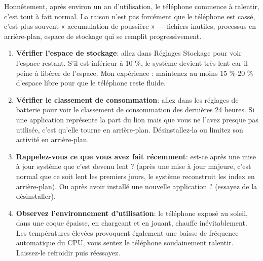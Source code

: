 


Honnêtement, après environ un an d'utilisation, le téléphone commence à ralentir, c'est tout à fait normal. La raison n'est pas forcément que le téléphone est cassé, c'est plus souvent « accumulation de poussière » — fichiers inutiles, processus en arrière-plan, espace de stockage qui se remplit progressivement.


\begin{enumerate}
  \item \textbf{Vérifier l'espace de stockage}: allez dans Réglages Stockage pour voir l'espace restant. S'il est inférieur à 10 \%, le système devient très lent car il peine à libérer de l'espace. Mon expérience : maintenez au moins 15 \%-20 \% d'espace libre pour que le téléphone reste fluide.
  \item \textbf{Vérifier le classement de consommation}: allez dans les réglages de batterie pour voir le classement de consommation des dernières 24 heures. Si une application représente la part du lion mais que vous ne l'avez presque pas utilisée, c'est qu'elle tourne en arrière-plan. Désinstallez-la ou limitez son activité en arrière-plan.
  \item \textbf{Rappelez-vous ce que vous avez fait récemment}: est-ce après une mise à jour système que c'est devenu lent ? (après une mise à jour majeure, c'est normal que ce soit lent les premiers jours, le système reconstruit les index en arrière-plan). Ou après avoir installé une nouvelle application ? (essayez de la désinstaller).
  \item \textbf{Observez l'environnement d'utilisation}: le téléphone exposé au soleil, dans une coque épaisse, en chargeant et en jouant, chauffe inévitablement. Les températures élevées provoquent également une baisse de fréquence automatique du CPU, vous sentez le téléphone soudainement ralentir. Laissez-le refroidir puis réessayez.
\end{enumerate}


